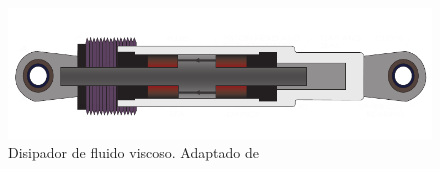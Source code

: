 	\begin{figure}[!h]
	\centering
		\includegraphics[scale=1]{E_IMAGENES/2_Capitulo2/Cap2_Imagen2.pdf}
	\caption[Disipador de fluido viscoso]{\centering\footnotesize Disipador de fluido viscoso.  Adaptado de \citet{Taylor2019}}
	\label{Cap2_Figura2}
	\end{figure}
	
	
	
	
